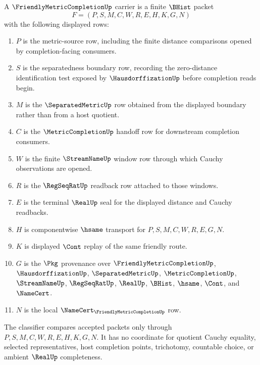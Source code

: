 \begin{definition}
\label{def:friendly-metric-completion-carrier}
A $\FriendlyMetricCompletionUp$ carrier is a finite $\BHist$ packet
$$
F=(P,S,M,C,W,R,E,H,K,G,N)
$$
with the following displayed rows:
\begin{enumerate}
\item $P$ is the metric-source row, including the finite distance comparisons opened by completion-facing consumers.
\item $S$ is the separatedness boundary row, recording the zero-distance identification test exposed by $\HausdorffizationUp$ before completion reads begin.
\item $M$ is the $\SeparatedMetricUp$ row obtained from the displayed boundary rather than from a host quotient.
\item $C$ is the $\MetricCompletionUp$ handoff row for downstream completion consumers.
\item $W$ is the finite $\StreamNameUp$ window row through which Cauchy observations are opened.
\item $R$ is the $\RegSeqRatUp$ readback row attached to those windows.
\item $E$ is the terminal $\RealUp$ seal for the displayed distance and Cauchy readbacks.
\item $H$ is componentwise $\hsame$ transport for $P,S,M,C,W,R,E,G,N$.
\item $K$ is displayed $\Cont$ replay of the same friendly route.
\item $G$ is the $\Pkg$ provenance over $\FriendlyMetricCompletionUp$, $\HausdorffizationUp$, $\SeparatedMetricUp$, $\MetricCompletionUp$, $\StreamNameUp$, $\RegSeqRatUp$, $\RealUp$, $\BHist$, $\hsame$, $\Cont$, and $\NameCert$.
\item $N$ is the local $\NameCert_{\FriendlyMetricCompletionUp}$ row.
\end{enumerate}
The classifier compares accepted packets only through $P,S,M,C,W,R,E,H,K,G,N$. It has no coordinate for quotient Cauchy equality, selected representatives, host completion points, trichotomy, countable choice, or ambient $\RealUp$ completeness.
\end{definition}

